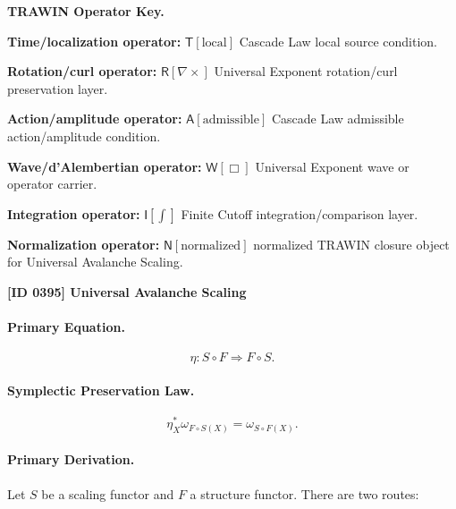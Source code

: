 \par\vspace{0.45\baselineskip}
\noindent\begin{minipage}[t]{\linewidth}
\begingroup
\small
\raggedright
\textbf{TRAWIN Operator Key.}\par
\noindent\textbf{Time/localization operator:} $\mathsf{T}\!\left[\mathrm{local}\right]$ Cascade Law local source condition.\par
\noindent\textbf{Rotation/curl operator:} $\mathsf{R}\!\left[\nabla\times\right]$ Universal Exponent rotation/curl preservation layer.\par
\noindent\textbf{Action/amplitude operator:} $\mathsf{A}\!\left[\mathrm{admissible}\right]$ Cascade Law admissible action/amplitude condition.\par
\noindent\textbf{Wave/d'Alembertian operator:} $\mathsf{W}\!\left[\Box\right]$ Universal Exponent wave or operator carrier.\par
\noindent\textbf{Integration operator:} $\mathsf{I}\!\left[\int\right]$ Finite Cutoff integration/comparison layer.\par
\noindent\textbf{Normalization operator:} $\mathsf{N}\!\left[\mathrm{normalized}\right]$ normalized TRAWIN closure object for Universal Avalanche Scaling.\par
\endgroup
\end{minipage}

\clearpage
\noindent\textbf{[ID 0395] Universal Avalanche Scaling}\par
\vspace{0.35em}
\paragraph{Primary Equation.}
\begin{equation}
\eta:S\circ F\Rightarrow F\circ S.
\end{equation}

\paragraph{Symplectic Preservation Law.}
\begin{equation}
\eta_X^{*}\omega_{F\circ S(X)}
=
\omega_{S\circ F(X)}.
\end{equation}

\paragraph{Primary Derivation.}
Let $S$ be a scaling functor and $F$ a structure functor.  
There are two routes:

